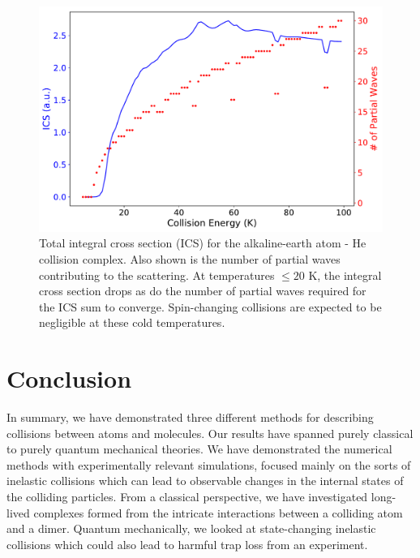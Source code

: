 \documentclass[%
 reprint,
 amsmath,amssymb,
 aps,
 nofootinbib
]{revtex4-1}
\begin{document}
\begin{figure}[t]
\includegraphics[width=1\columnwidth]{./Results/ICSandPartialWaves}
\caption{Total integral cross section (ICS) for the alkaline-earth atom - He collision complex. Also shown is the number of partial waves contributing to the scattering. At temperatures $\leq 20$ K, the integral cross section drops as do the number of partial waves required for the ICS sum to converge. Spin-changing collisions are expected to be negligible at these cold temperatures.}
\label{fig:TotalCrossSection}
\end{figure}

\section{Conclusion}
In summary, we have demonstrated three different methods for describing collisions between atoms and molecules. Our results have spanned purely classical to purely quantum mechanical theories. We have demonstrated the numerical methods with experimentally relevant simulations, focused mainly on the sorts of inelastic collisions which can lead to observable changes in the internal states of the colliding particles. From a classical perspective, we have investigated long-lived complexes formed from the intricate interactions between a colliding atom and a dimer. Quantum mechanically, we looked at state-changing inelastic collisions which could also lead to harmful trap loss from an experiment. 
\end{document}
